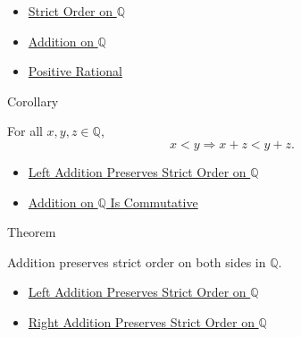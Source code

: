\begin{dependencies}
\begin{itemize}
  \item \hyperref[def:strict-order-on-q]{Strict Order on $\mathbb{Q}$}
  \item \hyperref[def:addition-on-q-classes]{Addition on $\mathbb{Q}$}
  \item \hyperref[def:positive-rational]{Positive Rational}
\end{itemize}
\end{dependencies}

\begin{corollarybox}{Corollary}
\begin{corollary}
\label{cor:right-addition-preserves-strict-order-on-q}
For all $x,y,z\in\mathbb{Q}$,
\[
x<y \Longrightarrow x+z<y+z.
\]
\end{corollary}
\end{corollarybox}

\begin{dependencies}
\begin{itemize}
  \item \hyperref[thm:left-addition-preserves-strict-order-on-q]{Left Addition Preserves Strict Order on $\mathbb{Q}$}
  \item \hyperref[thm:addition-on-q-commutative]{Addition on $\mathbb{Q}$ Is Commutative}
\end{itemize}
\end{dependencies}

\begin{theorembox}{Theorem}
\begin{theorem}
\label{thm:addition-preserves-strict-order-on-q}
Addition preserves strict order on both sides in $\mathbb{Q}$.
\end{theorem}
\end{theorembox}

\begin{dependencies}
\begin{itemize}
  \item \hyperref[thm:left-addition-preserves-strict-order-on-q]{Left Addition Preserves Strict Order on $\mathbb{Q}$}
  \item \hyperref[cor:right-addition-preserves-strict-order-on-q]{Right Addition Preserves Strict Order on $\mathbb{Q}$}
\end{itemize}
\end{dependencies}

